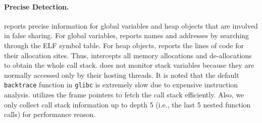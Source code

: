 \paragraph{Precise Detection.} \Cheetah{} reports precise information for global variables and heap objects that are involved in false sharing. For global variables, \Cheetah{} reports names and addresses by searching through the ELF symbol table. For heap objects, \Cheetah{} reports the lines of code for their allocation sites. Thus, \Cheetah{} intercepts all memory allocations and de-allocations to obtain the whole call stack. 
\cheetah{} does not monitor stack variables because they are normally accessed only by their hosting threads. It is noted that the default \texttt{backtrace} function in \texttt{glibc} is extremely slow due to expensive instruction analysis. \cheetah{} utilizes the frame pointers to fetch the call stack efficiently. Also, we only collect call stack information up to depth 5 (i.e., the last 5 nested function calls) for performance reason.

 

